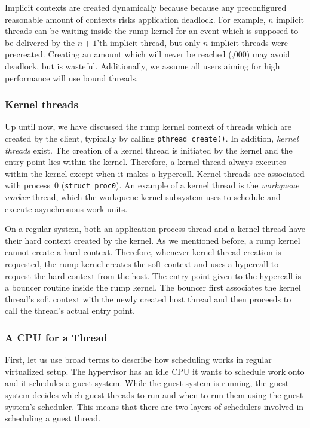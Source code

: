 Implicit contexts are created dynamically because because any
preconfigured reasonable amount of contexts risks application deadlock.
For example, $n$ implicit threads can be waiting inside the rump kernel
for an event which is supposed to be delivered by the $n+1$'th implicit
thread, but only $n$ implicit threads were precreated.  Creating an
amount which will never be reached (,000) may avoid deadlock,
but is wasteful.  Additionally, we assume all users aiming for high
performance will use bound threads.

\subsubsection{Kernel threads}

Up until now, we have discussed the rump kernel context of threads which
are created by the client, typically by calling \verb+pthread_create()+.
In addition, \textit{kernel threads} exist.  The creation of a kernel
thread is initiated by the kernel and the entry point lies within the
kernel.  Therefore, a kernel thread always executes within the kernel
except when it makes a hypercall.  Kernel threads are associated
with process~0 (\texttt{struct~proc0}).  An example of a kernel thread
is the \textit{workqueue worker} thread, which the workqueue kernel
subsystem uses to schedule and execute asynchronous work units.

On a regular system, both an application process thread and a kernel
thread have their hard context created by the kernel.  As we mentioned
before, a rump kernel cannot create a hard context.  Therefore, whenever
kernel thread creation is requested, the rump kernel creates the soft
context and uses a hypercall to request the hard context from the host.
The entry point given to the hypercall is a bouncer routine inside
the rump kernel.  The bouncer first associates the kernel thread's
soft context with the newly created host thread and then proceeds to
call the thread's actual entry point.

\subsubsection{A CPU for a Thread}
\label{sect:cpusched}

First, let us use broad terms to describe how scheduling works in regular
virtualized setup.  The hypervisor has an idle CPU it wants to schedule
work onto and it schedules a guest system.  While the guest system is
running, the guest system decides which guest threads to run and when
to run them using the guest system's scheduler.  This means that there
are two layers of schedulers involved in scheduling a guest thread.

